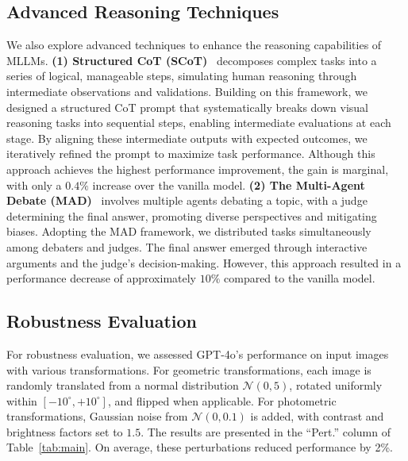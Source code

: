 \subsection{Advanced Reasoning Techniques}

We also explore advanced techniques to enhance the reasoning capabilities of MLLMs.
\textbf{(1) Structured CoT (SCoT)}~\cite{qiao2024prism} decomposes complex tasks into a series of logical, manageable steps, simulating human reasoning through intermediate observations and validations.
Building on this framework, we designed a structured CoT prompt that systematically breaks down visual reasoning tasks into sequential steps, enabling intermediate evaluations at each stage.
By aligning these intermediate outputs with expected outcomes, we iteratively refined the prompt to maximize task performance.
Although this approach achieves the highest performance improvement, the gain is marginal, with only a $0.4\%$ increase over the vanilla model.
\textbf{(2) The Multi-Agent Debate (MAD)}~\cite{liang2023encouraging} involves multiple agents debating a topic, with a judge determining the final answer, promoting diverse perspectives and mitigating biases.
Adopting the MAD framework, we distributed tasks simultaneously among debaters and judges.
The final answer emerged through interactive arguments and the judge’s decision-making.
However, this approach resulted in a performance decrease of approximately $10\%$ compared to the vanilla model.

\subsection{Robustness Evaluation}

For robustness evaluation, we assessed GPT-4o's performance on input images with various transformations.
For geometric transformations, each image is randomly translated from a normal distribution $\mathcal{N}(0, 5)$, rotated uniformly within $[-10^\circ, +10^\circ]$, and flipped when applicable.
For photometric transformations, Gaussian noise from $\mathcal{N}(0, 0.1)$ is added, with contrast and brightness factors set to $1.5$.
The results are presented in the ``Pert.'' column of Table~\ref{tab:main}.
On average, these perturbations reduced performance by 2\%.
